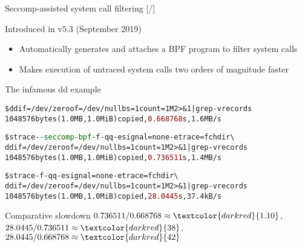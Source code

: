 \documentclass[unicode,aspectratio=169,xcolor={table,dvipsnames,usernames}]{beamer}
\begin{document}
\begin{frame}[fragile]{Seccomp-assisted system call filtering \hfill [\insertframenumber/\inserttotalframenumber]}
\begin{block}{Introduced in v5.3 (September 2019)}
\scriptsize
\begin{itemize}
\item Automatically generates and attaches a BPF program to filter system calls
\item Makes execution of untraced system calls two orders of magnitude faster
\end{itemize}
\end{block}

\begin{block}{The infamous dd example}
\scriptsize
\begin{alltt}
\$ dd if=/dev/zero of=/dev/null bs=1 count=1M 2>\&1 | grep -v records
1048576 bytes (1.0 MB, 1.0 MiB) copied, \textcolor{darkred}{0.668768} s, 1.6 MB/s

\$ strace \textcolor{darkgreen}{-{}-seccomp-bpf} -f -qq -e signal=none -e trace=fchdir {\textbackslash}
  dd if=/dev/zero of=/dev/null bs=1 count=1M 2>\&1 | grep -v records
1048576 bytes (1.0 MB, 1.0 MiB) copied, \textcolor{darkred}{0.736511} s, 1.4 MB/s

\$ strace -f -qq -e signal=none -e trace=fchdir {\textbackslash}
  dd if=/dev/zero of=/dev/null bs=1 count=1M 2>\&1 | grep -v records
1048576 bytes (1.0 MB, 1.0 MiB) copied, \textcolor{darkred}{28.0445} s, 37.4 kB/s
\end{alltt}
\end{block}

\begin{block}{Comparative slowdown}
$0.736511 / 0.668768 \approx \textcolor{darkred}{1.10}$,
$28.0445 / 0.736511 \approx \textcolor{darkred}{38}$,
$28.0445 / 0.668768 \approx \textcolor{darkred}{42}$
\end{block}
\end{frame}
\end{document}
